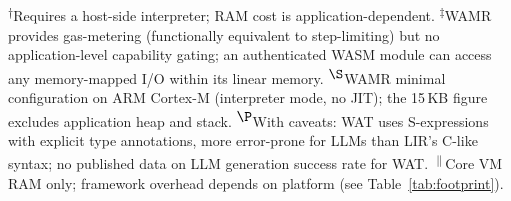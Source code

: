 \documentclass[a4paper,fleqn,longmktitle]{cas-dc}
\begin{document}
\begin{table}[t]
\centering
\caption{Design-space positioning of representative approaches and embedded VMs.}
\label{tab:rw_comparison}
\footnotesize
{}\\[2pt]
{\footnotesize \textsuperscript{$\dagger$}Requires a host-side interpreter; RAM cost is application-dependent. \textsuperscript{$\ddagger$}WAMR provides gas-metering (functionally equivalent to step-limiting) but no application-level capability gating; an authenticated WASM module can access any memory-mapped I/O within its linear memory. \textsuperscript{$\S$}WAMR minimal configuration on ARM Cortex-M (interpreter mode, no JIT); the 15\,KB figure excludes application heap and stack. \textsuperscript{$\P$}With caveats: WAT uses S-expressions with explicit type annotations, more error-prone for LLMs than LIR's C-like syntax; no published data on LLM generation success rate for WAT. \textsuperscript{$\|$}Core VM RAM only; framework overhead depends on platform (see Table~\ref{tab:footprint}).}
\end{table}
\end{document}
